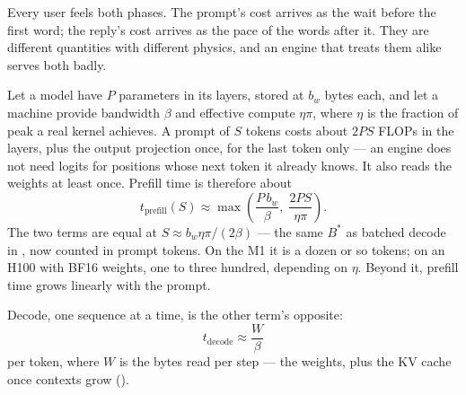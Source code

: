 Every user feels both phases. The prompt's cost arrives as the wait before
the first word; the reply's cost arrives as the pace of the words after it.
They are different quantities with different physics, and an engine that
treats them alike serves both badly.



Let a model have $P$ parameters in its layers, stored at $b_w$ bytes each,
and let a machine provide bandwidth $\beta$ and effective compute
$\eta\pi$, where $\eta$ is the fraction of peak a real kernel achieves. A
prompt of $S$ tokens costs about $2PS$ FLOPs in the layers, plus the output
projection once, for the last token only --- an engine does not need logits
for positions whose next token it already knows. It also reads the weights at
least once. Prefill time is therefore about
\begin{equation}
t_{\text{prefill}}(S) \approx \max\!\left(\frac{P\,b_w}{\beta},\;
\frac{2PS}{\eta\pi}\right).
\label{eq:prefill-time}
\end{equation}
The two terms are equal at $S \approx b_w\eta\pi/(2\beta)$ --- the same
$B^{*}$ as batched decode in , now counted in prompt tokens.
On the M1 it is a dozen or so tokens; on an H100 with BF16 weights, one to
three hundred, depending on $\eta$. Beyond it, prefill time grows linearly with
the prompt.

Decode, one sequence at a time, is the other term's opposite:
\begin{equation}
t_{\text{decode}} \approx \frac{W}{\beta}
\label{eq:decode-time}
\end{equation}
per token, where $W$ is the bytes read per step --- the weights, plus the KV
cache once contexts grow ().


